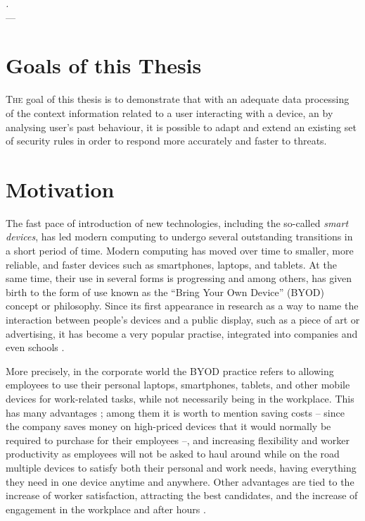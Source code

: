 \label{chap:introduction}
\begin{flushright}{\slshape
    .} \\ \medskip
    --- {}
\end{flushright}
\minitoc\mtcskip
\vfill



\section{Goals of this Thesis} %

\lettrine{T}{he} goal of this thesis is to demonstrate that with an adequate data processing of the context information related to a user interacting with a device, an by analysing user's past behaviour, it is possible to adapt and extend an existing set of security rules in order to respond more accurately and faster to threats.

\section{Motivation}
\label{sec:intro:eas}

The fast pace of introduction of new technologies, including the so-called \textit{smart devices}, has led modern computing to undergo several outstanding transitions in a short period of time. Modern computing has moved over time to smaller, more reliable, and faster devices such as smartphones, laptops, and tablets. At the same time, their use in several forms is progressing and among others, has given birth to the form of use known as the ``Bring Your Own Device'' (BYOD) concept or philosophy. Since its first appearance in research \cite{ballagas2004byod} as a way to name the interaction between people's devices and a public display, such as a piece of art or advertising, it has become a very popular practise, integrated into companies \cite{thomson2012byod} and even schools \cite{song2014bring}.

More precisely, in the corporate world the BYOD practice refers to allowing employees to use their personal laptops, smartphones, tablets, and other mobile devices
for work-related tasks, while not necessarily being in the workplace. This has many advantages \cite{singh2012byod}; among them it is worth to mention saving costs --
since the company saves money on high-priced devices that it would normally be required to purchase for their employees --, and increasing flexibility and worker productivity as employees will not be asked to haul around while on the road multiple devices to satisfy both their personal and work needs, having everything they need in one device anytime and anywhere. Other advantages are tied to the increase of worker satisfaction, attracting the best candidates, and the increase of engagement in the workplace and after hours \cite{singh2012byod}. 

